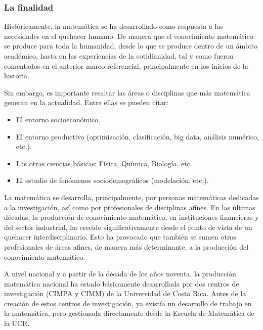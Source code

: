 \subsubsection{La finalidad}

Históricamente, la matemática se ha desarrollado como respuesta a las necesidades en el quehacer humano. De manera que el conocimiento matemático se produce para toda la humanidad, desde lo que se produce dentro de un ámbito académico, hasta en las experiencias de la cotidianidad, tal y como fueron comentados en el anterior marco referencial, principalmente en los
inicios de la historia.

Sin embargo, es importante resaltar las áreas o disciplinas que más matemática generan en la actualidad. Entre ellas se pueden citar: 

\begin{itemize}
    
    \color{blue} \item \color{black} El entorno socioeconómico. 

    
     \color{blue} \item \color{black} El entorno productivo (optimización, clasificación, big data, análisis numérico, etc.).  
     
    \color{blue} \item \color{black}  Las otras ciencias básicas: Física, Química, Biología, etc.
    
     \color{blue} \item \color{black} El estudio de fenómenos sociodemográficos (modelación, etc.).
     
     \end{itemize}
     
La matemática se desarrolla, principalmente, por personas matemáticas dedicadas a la investigación, así como por profesionales de disciplinas afines. En las últimas décadas, la producción de conocimiento matemático, en instituciones financieras y del sector industrial, ha crecido significativamente desde el punto de vista de un quehacer interdisciplinario. Esto ha provocado que también se sumen otros profesionales de áreas afines, de manera más determinante, a la producción del conocimiento matemático.

A nivel nacional y a partir de la década de los años noventa, la producción matemática nacional ha estado básicamente desarrollada por dos centros de investigación (CIMPA y CIMM) de la Universidad de Costa Rica. Antes de la creación de estos centros de investigación, ya existía un desarrollo de trabajo en la matemática, pero gestionada directamente desde la Escuela de Matemática de la UCR. 

